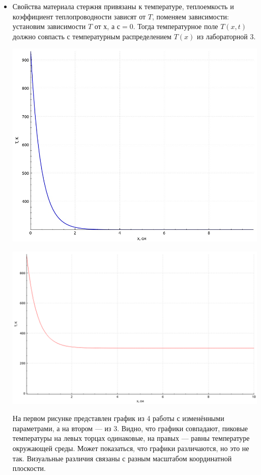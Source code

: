 \documentclass[a4paper,oneside,12pt]{extreport}
\begin{document}
\begin{enumerate}
\begin{itemize}
		\item Свойства материала стержня привязаны к температуре, теплоемкость и коэффициент теплопроводности  зависят от $T$, поменяем зависимости: установим зависимости $T$ от $х$, а $с = 0$.
		Тогда температурное поле $T(x,t)$ должно совпасть с температурным распределением $T(x)$ из лабораторной 3.

		\includegraphics[width=\linewidth]{inc/img/graph4-1}

		\includegraphics[width=\linewidth]{inc/img/graph4-2}

		На первом рисунке представлен график из 4 работы с изменёнными параметрами, а на втором — из 3.
		Видно, что графики совпадают, пиковые температуры на левых торцах одинаковые, на правых — равны температуре окружающей среды.
		Может показаться, что графики различаются, но это не так.
		Визуальные различия связаны с разным масштабом координатной плоскости.
	\end{itemize}



\end{enumerate}
\end{document}
